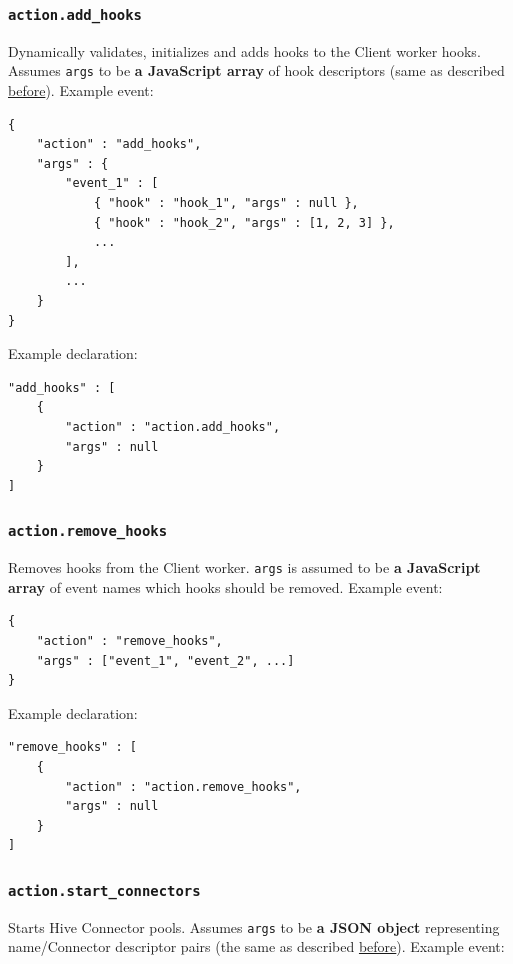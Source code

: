 \documentclass[a4paper]{article}
\begin{document}
\subsubsection{\texttt{action.add\_hooks}}
\label{sec-9-3-6}

Dynamically validates, initializes and adds hooks to the Client worker hooks. Assumes \texttt{args} to be \textbf{a JavaScript array} of hook descriptors (same as described \hyperref[ref-hooks_config]{before}). Example event:

\begin{verbatim}
{
    "action" : "add_hooks",
    "args" : {
        "event_1" : [
            { "hook" : "hook_1", "args" : null },
            { "hook" : "hook_2", "args" : [1, 2, 3] },
            ...
        ],
        ...
    }
}
\end{verbatim}




\noindent
Example declaration:

\begin{verbatim}
"add_hooks" : [
    {
        "action" : "action.add_hooks",
        "args" : null
    }
]
\end{verbatim}
\subsubsection{\texttt{action.remove\_hooks}}
\label{sec-9-3-7}

Removes hooks from the Client worker. \texttt{args} is assumed to be \textbf{a JavaScript array} of event names which hooks should be removed. Example event:

\begin{verbatim}
{
    "action" : "remove_hooks",
    "args" : ["event_1", "event_2", ...]
}
\end{verbatim}




\noindent
Example declaration:

\begin{verbatim}
"remove_hooks" : [
    {
        "action" : "action.remove_hooks",
        "args" : null
    }
]
\end{verbatim}
\subsubsection{\texttt{action.start\_connectors}}
\label{sec-9-3-8}

Starts Hive Connector pools. Assumes \texttt{args} to be \textbf{a JSON object} representing name/Connector descriptor pairs (the same as described \hyperref[ref-connectors_config]{before}). Example event:
\end{document}
